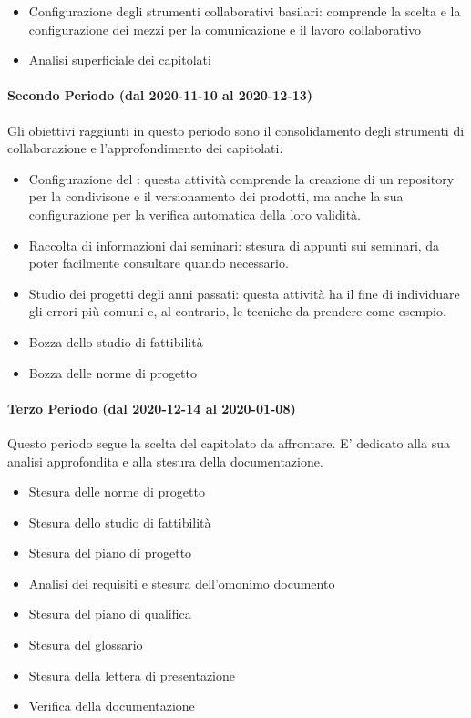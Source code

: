 \begin{itemize}
	\item Configurazione degli strumenti collaborativi basilari: comprende la scelta e la configurazione dei mezzi per la comunicazione e il lavoro collaborativo
	\item Analisi superficiale dei capitolati
	
\end{itemize}

\paragraph{Secondo Periodo (dal 2020-11-10 al 2020-12-13)}
Gli obiettivi raggiunti in questo periodo sono il consolidamento degli strumenti di collaborazione e l'approfondimento dei capitolati.
\begin{itemize}
	\item Configurazione del : questa attività comprende la creazione di un repository per la condivisone e il versionamento dei prodotti, ma anche la sua configurazione per la verifica automatica della loro validità.
	\item Raccolta di informazioni dai seminari: stesura di appunti sui seminari, da poter facilmente consultare quando necessario.
	\item Studio dei progetti degli anni passati: questa attività ha il fine di individuare gli errori più comuni e, al contrario, le tecniche da prendere come esempio.
	\item Bozza dello studio di fattibilità
	\item Bozza delle norme di progetto
\end{itemize}

\paragraph{Terzo Periodo (dal 2020-12-14 al 2020-01-08)}
Questo periodo segue la scelta del capitolato da affrontare. E' dedicato alla sua analisi approfondita e alla stesura della documentazione. 
\begin{itemize}
	\item Stesura delle norme di progetto
	\item Stesura dello studio di fattibilità
	\item Stesura del piano di progetto
	\item Analisi dei requisiti e stesura dell'omonimo documento
	\item Stesura del piano di qualifica
	\item Stesura del glossario
	\item Stesura della lettera di presentazione
	\item Verifica della documentazione
\end{itemize}

